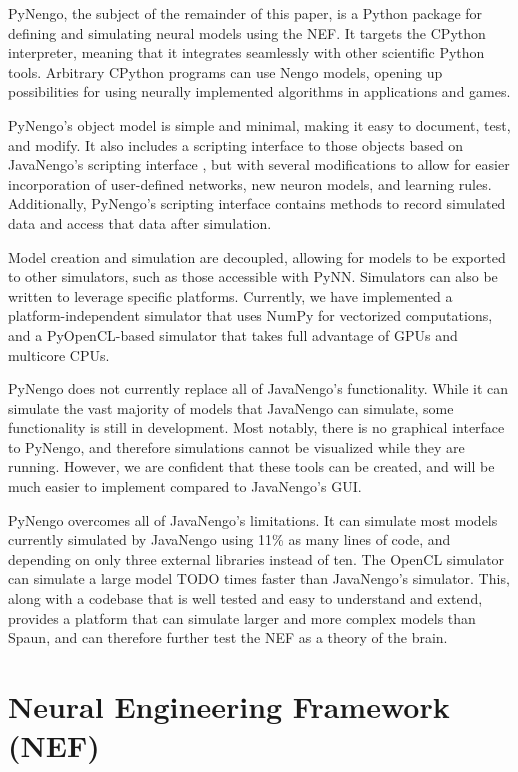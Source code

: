\documentclass{frontiersSCNS}
\begin{document}
PyNengo,
the subject of the remainder of this paper,
is a Python package for
defining and simulating
neural models using the NEF.
It targets the CPython interpreter,
meaning that it integrates seamlessly
with other scientific Python tools.
Arbitrary CPython programs
can use Nengo models,
opening up possibilities
for using neurally implemented algorithms
in applications and games.

PyNengo's object model is simple and minimal,
making it easy to
document, test, and modify.
It also includes a scripting interface to those objects
based on JavaNengo's scripting interface \cite{TODO},
but with several modifications
to allow for easier incorporation
of user-defined networks,
new neuron models, and learning rules.
Additionally, PyNengo's scripting interface
contains methods to record simulated data
and access that data after simulation.

Model creation and simulation are decoupled,
allowing for models to be exported
to other simulators,
such as those accessible with PyNN.
Simulators can also be written
to leverage specific platforms.
Currently, we have implemented
a platform-independent simulator
that uses NumPy for vectorized computations,
and a PyOpenCL-based
simulator that takes full advantage of GPUs
and multicore CPUs.

PyNengo does not currently
replace all of JavaNengo's functionality.
While it can simulate the vast majority
of models that JavaNengo can simulate,
some functionality is still in development.
Most notably, there is no graphical interface
to PyNengo, and therefore simulations
cannot be visualized while they are running.
However, we are confident that these tools
can be created, and will be much easier
to implement compared to JavaNengo's GUI.

PyNengo overcomes all of JavaNengo's limitations.
It can simulate most models
currently simulated by JavaNengo
using 11\% as many lines of code,
and depending on
only three external libraries instead of ten.
The OpenCL simulator can simulate
a large model TODO times
faster than JavaNengo's simulator.
This, along with a codebase
that is well tested and
easy to understand and extend,
provides a platform
that can simulate larger and more complex
models than Spaun,
and can therefore further
test the NEF as a theory of the brain.

\section{Neural Engineering Framework (NEF)}
\end{document}
